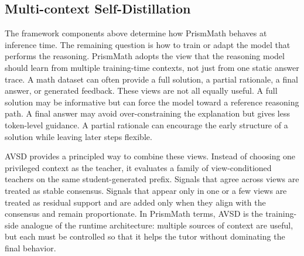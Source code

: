 \subsection{Multi-context Self-Distillation}

The framework components above determine how PrismMath behaves at inference time. The remaining question is how to train or adapt the model that performs the reasoning. PrismMath adopts the view that the reasoning model should learn from multiple training-time contexts, not just from one static answer trace. A math dataset can often provide a full solution, a partial rationale, a final answer, or generated feedback. These views are not all equally useful. A full solution may be informative but can force the model toward a reference reasoning path. A final answer may avoid over-constraining the explanation but gives less token-level guidance. A partial rationale can encourage the early structure of a solution while leaving later steps flexible.

AVSD provides a principled way to combine these views. Instead of choosing one privileged context as the teacher, it evaluates a family of view-conditioned teachers on the same student-generated prefix. Signals that agree across views are treated as stable consensus. Signals that appear only in one or a few views are treated as residual support and are added only when they align with the consensus and remain proportionate. In PrismMath terms, AVSD is the training-side analogue of the runtime architecture: multiple sources of context are useful, but each must be controlled so that it helps the tutor without dominating the final behavior.
